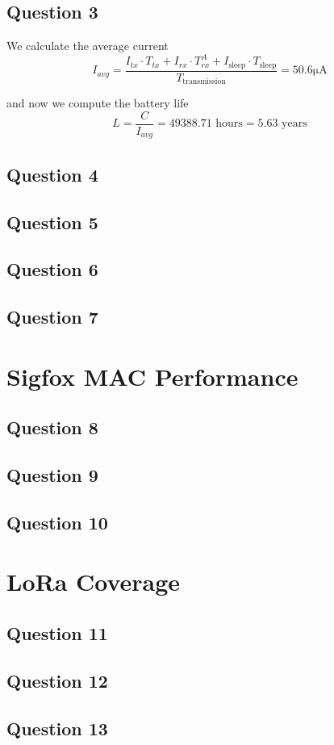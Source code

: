 \documentclass[]{article}
\begin{document}
	\subsection*{Question 3}
	
	We calculate the average current
	\begin{equation}
		I_{avg} = \frac{I_{tx} \cdot T_{tx} + I_{rx} \cdot T_{rx}^A + I_{\text{sleep}} \cdot T_{\text{sleep}}}{T_{\text{transmission}}} = 50.6 \mathrm{\mu A}
	\end{equation}
	
	and now we compute the battery life
	\begin{equation}
		L = \frac{C}{I_{avg}} = 49388.71 \text{ hours} = 5.63 \text{ years}
	\end{equation}
	
	\subsection*{Question 4}
	
	\subsection*{Question 5}
	
	\subsection*{Question 6}
	
	\subsection*{Question 7}
	
	\section{Sigfox MAC Performance}
	
	\subsection*{Question 8}
	
	\subsection*{Question 9}
	
	\subsection*{Question 10}
	
	\section{LoRa Coverage}
	
	\subsection*{Question 11}
	
	\subsection*{Question 12}
	
	\subsection*{Question 13}
\end{document}
